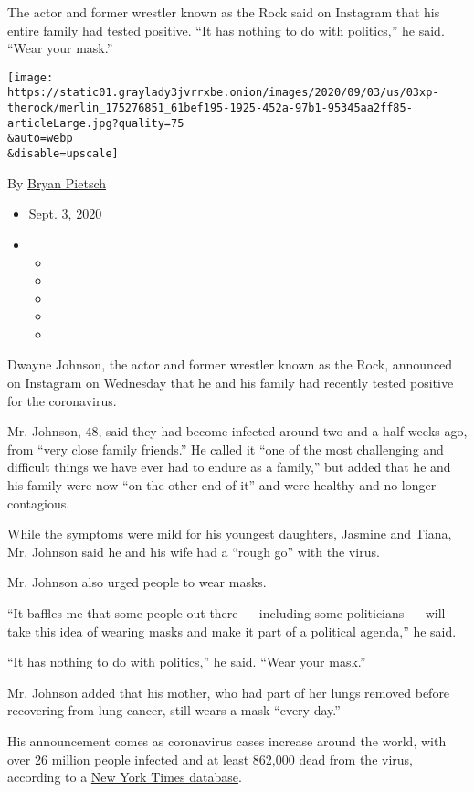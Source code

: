 The actor and former wrestler known as the Rock said on Instagram that
his entire family had tested positive. ``It has nothing to do with
politics,'' he said. ``Wear your mask.''

\texttt{[image: https://static01.graylady3jvrrxbe.onion/images/2020/09/03/us/03xp-therock/merlin\_175276851\_61bef195-1925-452a-97b1-95345aa2ff85-articleLarge.jpg?quality=75\\\&auto=webp\\\&disable=upscale]}

By \href{https://www.nytimes3xbfgragh.onion/by/bryan-pietsch}{Bryan
Pietsch}

\begin{itemize}
\item
  Sept. 3, 2020
\item
  \begin{itemize}
  \item
  \item
  \item
  \item
  \item
  \end{itemize}
\end{itemize}

Dwayne Johnson, the actor and former wrestler known as the Rock,
announced on Instagram on Wednesday that he and his family had recently
tested positive for the coronavirus.

Mr. Johnson, 48, said they had become infected around two and a half
weeks ago, from ``very close family friends.'' He called it ``one of the
most challenging and difficult things we have ever had to endure as a
family,'' but added that he and his family were now ``on the other end
of it'' and were healthy and no longer contagious.

While the symptoms were mild for his youngest daughters, Jasmine and
Tiana, Mr. Johnson said he and his wife had a ``rough go'' with the
virus.

Mr. Johnson also urged people to wear masks.

``It baffles me that some people out there --- including some
politicians --- will take this idea of wearing masks and make it part of
a political agenda,'' he said.

``It has nothing to do with politics,'' he said. ``Wear your mask.''

Mr. Johnson added that his mother, who had part of her lungs removed
before recovering from lung cancer, still wears a mask ``every day.''

His announcement comes as coronavirus cases increase around the world,
with over 26 million people infected and at least 862,000 dead from the
virus, according to a
\href{https://www.nytimes3xbfgragh.onion/interactive/2020/world/coronavirus-maps.html}{New
York Times database}.


